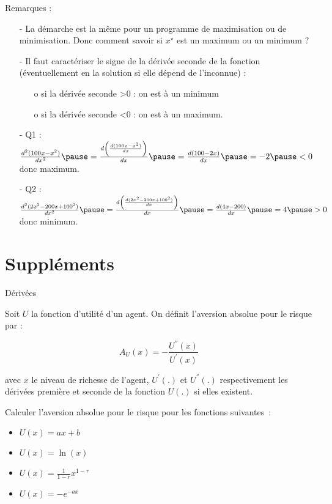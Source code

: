 \documentclass[9pt,handout,professionalfonts,hyperref]{beamer}
\begin{document}
\begin{frame}

Remarques :
\begin{itemize} 
\pause \item[-] La démarche est la même pour un programme de maximisation ou de minimisation. Donc comment savoir si $x^\star$ est un maximum ou un minimum ?\newline 

\pause \item[-] Il faut caractériser le signe de la dérivée seconde de la fonction (éventuellement en la solution si elle dépend de l'inconnue) :

\begin{itemize} 
\pause \item[o] si la dérivée seconde >0 : on est à un minimum 
\pause \item[o] si la dérivée seconde <0 : on est à un maximum. \newline 
\end{itemize}

\pause \item[-] Q1 : $\frac{d^2(100x-x^2)}{dx^2} \pause = \frac{d\left(\frac{d(100x-x^2)}{dx}\right)}{dx}\pause = \frac{d(100-2x)}{dx} \pause = -2\pause <0   $ \pause donc maximum. \newline 

\pause \item[-] Q2 : $\frac{d^2(2x^2 -200x + 100^2)}{dx^2} \pause = \frac{d\left(\frac{d(2x^2 -200x + 100^2)}{dx}\right)}{dx}\pause = \frac{d(4x -200)}{dx} \pause = 4 \pause >0 $ \pause donc minimum.

\end{itemize}

\end{frame}

\section{Suppléments}

\begin{frame}{Dérivées}

Soit $U$ la fonction d'utilité d'un agent. On définit l'aversion absolue pour le risque par : 

\[A_U(x) = -\frac{U^{''}(x)}{U^{'}(x)}\]

avec $x$ le niveau de richesse de l'agent, $U^{'}(.)$ et $U^{''}(.)$ respectivement les dérivées première et seconde de la fonction $U(.)$ si elles existent. \newline 

Calculer l'aversion absolue pour le risque pour les fonctions suivantes~: 
\begin{itemize}
	\item $U(x) = ax+b$
	\item $U(x) = \ln(x) $
	\item $U(x) = \frac{1}{1-r}x^{1-r}$
	\item $U(x) = -e^{-ax}$
\end{itemize}

\end{frame}
\end{document}
